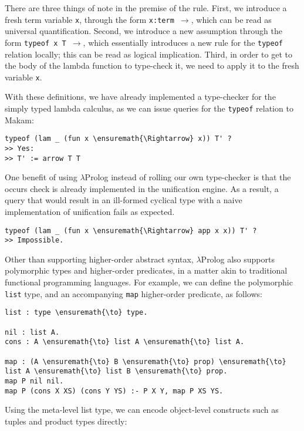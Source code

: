 There are three things of note in the premise of the rule. First, we
introduce a fresh term variable \texttt{x}, through the form
\texttt{x:term\ \ensuremath{\to}}, which can be read as universal
quantification. Second, we introduce a new assumption through the form
\texttt{typeof\ x\ T\ \ensuremath{\to}}, which essentially introduces a
new rule for the \texttt{typeof} relation locally; this can be read as
logical implication. Third, in order to get to the body of the lambda
function to type-check it, we need to apply it to the fresh variable
\texttt{x}.

With these definitions, we have already implemented a type-checker for
the simply typed lambda calculus, as we can issue queries for the
\texttt{typeof} relation to Makam:

\begin{verbatim}
typeof (lam _ (fun x \ensuremath{\Rightarrow} x)) T' ?
>> Yes:
>> T' := arrow T T
\end{verbatim}

One benefit of using \ensuremath{\lambda}Prolog instead of rolling our own type-checker is
that the occurs check is already implemented in the unification engine.
As a result, a query that would result in an ill-formed cyclical type
with a naive implementation of unification fails as expected.

\begin{verbatim}
typeof (lam _ (fun x \ensuremath{\Rightarrow} app x x)) T' ?
>> Impossible.
\end{verbatim}

Other than supporting higher-order abstract syntax, \ensuremath{\lambda}Prolog also
supports polymorphic types and higher-order predicates, in a matter akin
to traditional functional programming languages. For example, we can
define the polymorphic \texttt{list} type, and an accompanying
\texttt{map} higher-order predicate, as follows:

\begin{verbatim}
list : type \ensuremath{\to} type.

nil : list A.
cons : A \ensuremath{\to} list A \ensuremath{\to} list A.

map : (A \ensuremath{\to} B \ensuremath{\to} prop) \ensuremath{\to} list A \ensuremath{\to} list B \ensuremath{\to} prop.
map P nil nil.
map P (cons X XS) (cons Y YS) :- P X Y, map P XS YS.
\end{verbatim}

Using the meta-level list type, we can encode object-level constructs
such as tuples and product types directly:

